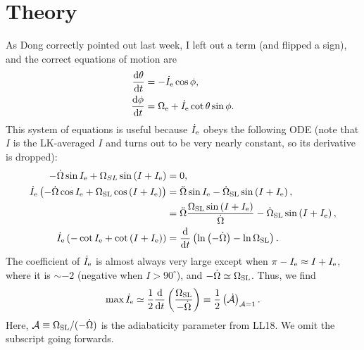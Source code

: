 \documentclass[11pt,
        usenames, %
        dvipsnames %
    ]{article}
\newcommand*{\rd}[2]{\frac{\mathrm{d}#1}{\mathrm{d}#2}}
\newcommand*{\p}[1]{\left(#1\right)}
\begin{document}
\def\Snospace~{\S{}} %
\renewcommand*{\sectionautorefname}{\Snospace}
\renewcommand*{\appendixautorefname}{\Snospace}
\renewcommand*{\figureautorefname}{Fig.}
\renewcommand*{\equationautorefname}{Eq.}
\renewcommand*{\tableautorefname}{Tab.}

\section{Theory}

As Dong correctly pointed out last week, I left out a term (and flipped a sign),
and the correct equations of motion are
\begin{align}
    \rd{\theta}{t} &= -\dot{I}_{\rm e} \cos \phi\label{eq:dq},\\
    \rd{\phi}{t} &= \Omega_{\rm e} + \dot{I}_{\rm e} \cot \theta \sin
        \phi\label{eq:dphi}.
\end{align}
This system of equations is useful because $\dot{I}_{\rm e}$ obeys the following
ODE (note that $I$ is the LK-averaged $I$ and turns out to be very nearly
constant, so its derivative is dropped):
\begin{align}
    -\dot{\Omega} \sin I_{\rm e} + \Omega_{SL}\sin \p{I + I_{\rm e}}
        &= 0\label{eq:I_out_def},\\
    \dot{I}_{\rm e}\p{-\dot{\Omega}\cos I_{\rm e}
        + \Omega_{\rm SL}\cos\p{I + I_{\rm e}}}
        &= \ddot{\Omega} \sin I_{\rm e} - \dot{\Omega}_{\rm SL}
            \sin\p{I + I_{\rm e}},\\
        &= \ddot{\Omega}\frac{\Omega_{\rm SL}\sin\p{I + I_{\rm
            e}}}{\dot{\Omega}} - \dot{\Omega}_{\rm SL}\sin\p{I + I_{\rm e}},\\
    \dot{I}_{\rm e}\p{-\cot I_{\rm e} + \cot \p{I + I_{\rm e}}}
        &= \rd{}{t}\p{\ln \p{-\dot{\Omega}} - \ln
        \Omega_{\rm SL}}.\label{eq:idot_out_sol}
\end{align}
The coefficient of $\dot{I}_{\rm e}$ is almost always very large except when
$\pi - I_{\rm e} \approx I + I_{\rm e}$, where it is $\sim -2$ (negative when $I
> 90^\circ$), and $-\dot{\Omega} \simeq \Omega_{\rm SL}$. Thus, we find
\begin{equation}
    \max \dot{I}_{\rm e} \simeq
        \frac{1}{2}\rd{}{t}\p{\frac{\Omega_{\rm
        SL}}{-\dot{\Omega}}} \equiv
        \frac{1}{2}\p{\dot{\mathcal{A}}}_{\mathcal{A} = 1}.\label{eq:ie_max}
\end{equation}
Here, $\mathcal{A} \equiv \Omega_{\rm SL} / (-\dot{\Omega})$ is the adiabaticity
parameter from LL18. We omit the subscript going forwards.
\end{document}
